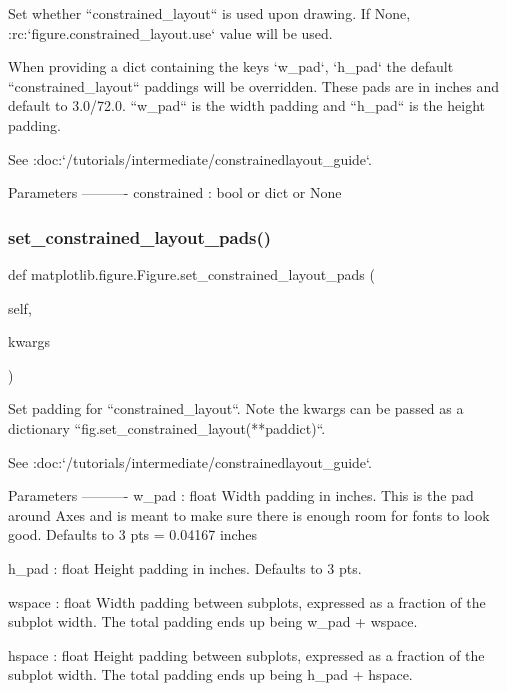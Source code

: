 \begin{DoxyVerb}Set whether ``constrained_layout`` is used upon drawing. If None,
:rc:`figure.constrained_layout.use` value will be used.

When providing a dict containing the keys `w_pad`, `h_pad`
the default ``constrained_layout`` paddings will be
overridden.  These pads are in inches and default to 3.0/72.0.
``w_pad`` is the width padding and ``h_pad`` is the height padding.

See :doc:`/tutorials/intermediate/constrainedlayout_guide`.

Parameters
----------
constrained : bool or dict or None
\end{DoxyVerb}
 \mbox{\label{classmatplotlib_1_1figure_1_1Figure_a5949bc30be69d3acb3c66756bc7bdab6}} 
\subsubsection{\texorpdfstring{set\+\_\+constrained\+\_\+layout\+\_\+pads()}{set\_constrained\_layout\_pads()}}
{\footnotesize\ttfamily def matplotlib.\+figure.\+Figure.\+set\+\_\+constrained\+\_\+layout\+\_\+pads (\begin{DoxyParamCaption}\item[{}]{self,  }\item[{}]{kwargs }\end{DoxyParamCaption})}

\begin{DoxyVerb}Set padding for ``constrained_layout``.  Note the kwargs can be passed
as a dictionary ``fig.set_constrained_layout(**paddict)``.

See :doc:`/tutorials/intermediate/constrainedlayout_guide`.

Parameters
----------
w_pad : float
    Width padding in inches.  This is the pad around Axes
    and is meant to make sure there is enough room for fonts to
    look good.  Defaults to 3 pts = 0.04167 inches

h_pad : float
    Height padding in inches. Defaults to 3 pts.

wspace : float
    Width padding between subplots, expressed as a fraction of the
    subplot width.  The total padding ends up being w_pad + wspace.

hspace : float
    Height padding between subplots, expressed as a fraction of the
    subplot width. The total padding ends up being h_pad + hspace.\end{DoxyVerb}
 \mbox{\label{classmatplotlib_1_1figure_1_1Figure_ac09795a9f5c841bb847e4bb96d47ac72}} 
